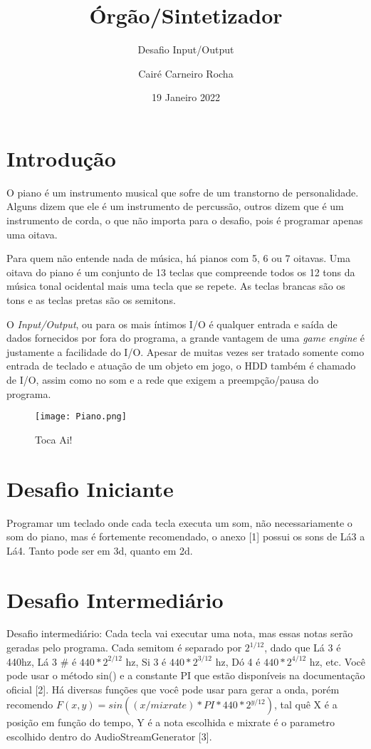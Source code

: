 \documentclass{scrartcl}
\title{Órgão/Sintetizador}
\subtitle{Desafio Input/Output}
\author{Cairé Carneiro Rocha}
\date{19 Janeiro 2022}
\begin{document}
\maketitle

\section{Introdução}


O piano é um instrumento musical que sofre de um transtorno de personalidade. Alguns dizem que ele é um instrumento de percussão, outros dizem que é um instrumento de corda, o que não importa para o desafio, pois é programar apenas uma oitava.

Para quem não entende nada de música, há pianos com 5, 6 ou 7 oitavas. Uma oitava do piano é um conjunto de 13 teclas que compreende todos os 12 tons da música tonal ocidental mais uma tecla que se repete. As teclas brancas são os tons e as teclas pretas são os semitons.

O \textit{Input/Output}, ou para os mais íntimos I/O é qualquer entrada e saída de dados fornecidos por fora do programa, a grande vantagem de uma \textit{game engine} é justamente a facilidade do I/O. Apesar de muitas vezes ser tratado somente como entrada de teclado e atuação de um objeto em jogo, o HDD também é chamado de I/O, assim como no som e a rede que exigem a preempção/pausa do programa.



\begin{figure}[h]
\centering
\texttt{[image: Piano.png]}
\caption{Toca Ai!}
\end{figure}

\pagebreak

\section{Desafio Iniciante}

Programar um teclado onde cada tecla executa um som, não necessariamente o som do piano, mas é fortemente recomendado, o anexo [1] possui os sons de Lá3 a Lá4. Tanto pode ser em 3d, quanto em 2d.

\section{Desafio Intermediário}

Desafio intermediário: Cada tecla vai executar uma nota, mas essas notas serão geradas pelo programa. Cada semitom é separado por $ 2^{1/12} $, dado que Lá 3 é 440hz, Lá 3 \# é $ 440*2^{2/12} $ hz, Si 3 é $ 440*2^{3/12} $ hz, Dó 4 é $ 440*2^{4/12} $ hz, etc. Você pode usar o método sin() e a constante PI que estão disponíveis na documentação oficial [2]. Há diversas funções que você pode usar para gerar a onda, porém recomendo $ F(x,y) = sin((x/mixrate)*PI*440*2^{y/12}) $, tal quê X é a posição em função do tempo, Y é a nota escolhida e mixrate é o parametro escolhido dentro do AudioStreamGenerator [3].
\end{document}
